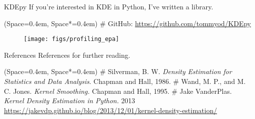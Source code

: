 \documentclass[11pt, aspectratio=149]{beamer}
\newcommand{\listSpace}{0.4em}
\theoremstyle{plain}
\begin{document}
\begin{frame}[fragile, t]{KDEpy}
	If you're interested in KDE in Python, I've written a library.
	\vspace{1em}
	\begin{easylist}[itemize]
		\ListProperties(Space=\listSpace, Space*=\listSpace)
		# GitHub: \url{https://github.com/tommyod/KDEpy}
	\end{easylist}
	\vfill
	\begin{figure}
		\centering
		\texttt{[image: figs/profiling\_epa]}
	\end{figure}
\end{frame}


\begin{frame}[fragile, t]{References}
	References for further reading.
	\vspace{1em}
	\begin{easylist}[itemize]
		\ListProperties(Space=\listSpace, Space*=\listSpace)
		# Silverman, B. W. \emph{Density Estimation for Statistics and Data Analysis}. Chapman and Hall, 1986.
		# Wand, M. P., and M. C. Jones. \emph{Kernel Smoothing.} Chapman and Hall, 1995.
		# Jake VanderPlas. \emph{Kernel Density Estimation in Python.} 2013 \\ \url{https://jakevdp.github.io/blog/2013/12/01/kernel-density-estimation/}
	\end{easylist}
\end{frame}
\end{document}
